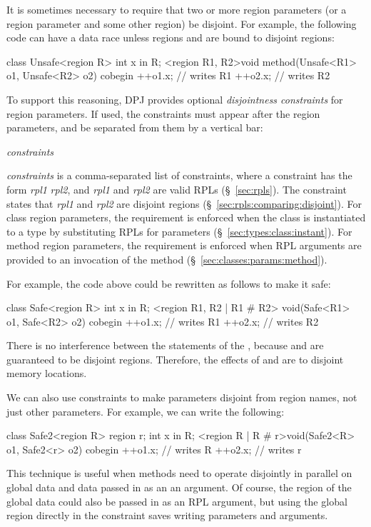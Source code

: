 It is sometimes necessary to require that two or more region
parameters (or a region parameter and some other region) be disjoint.
For example, the following code can have a data race unless regions
 and  are bound to disjoint regions:
%
\begin{dpjlisting}
class Unsafe<region R> {
    int x in R;
    <region R1, R2>void method(Unsafe<R1> o1, Unsafe<R2> o2) {
        cobegin {
            ++o1.x; // writes R1
            ++o2.x; // writes R2
        }
    }
}
\end{dpjlisting}
%
To support this reasoning, DPJ provides optional \emph{disjointness
  constraints} for region parameters.  If used, the constraints must
appear after the region parameters, and be separated from them by a
vertical bar:
%
\begin{description}
\item {} \emph{constraints} \kwd{>}
\end{description}
%
\emph{constraints} is a comma-separated list of constraints, where a
constraint has the form \emph{rpl1} \kwd{\#} \emph{rpl2}, and
\emph{rpl1} and \emph{rpl2} are valid RPLs (\S~\ref{sec:rpls}).  The
constraint states that \emph{rpl1} and \emph{rpl2} are disjoint
regions (\S~\ref{sec:rpls:comparing:disjoint}).  For class region
parameters, the requirement is enforced when the class is instantiated
to a type by substituting RPLs for parameters
(\S~\ref{sec:types:class:instant}).  For method region parameters, the
requirement is enforced when RPL arguments are provided to an
invocation of the method (\S~\ref{sec:classes:params:method}).

For example, the code above could be rewritten as follows to make it
safe:
%
\begin{dpjlisting}
class Safe<region R> {
    int x in R;
    <region R1, R2 | R1 # R2> void(Safe<R1> o1, Safe<R2> o2) {
        cobegin {
            ++o1.x; // writes R1
            ++o2.x; // writes R2
        }
    }
}
\end{dpjlisting}
%
There is no interference between the statements of the ,
because  and  are guaranteed to be disjoint regions.
Therefore, the effects of  and  are to
disjoint memory locations.

We can also use constraints to make parameters disjoint from region
names, not just other parameters.  For example, we can write the
following:
%
\begin{dpjlisting}
class Safe2<region R> {
    region r;
    int x in R;
    <region R | R # r>void(Safe2<R> o1, Safe2<r> o2) {
        cobegin {
            ++o1.x; // writes R
            ++o2.x; // writes r
        }
    }
}
\end{dpjlisting}
%
This technique is useful when methods need to operate disjointly in
parallel on global data and data passed in as an an argument.  Of
course, the region of the global data could also be passed in as an
RPL argument, but using the global region directly in the constraint
saves writing parameters and arguments.

